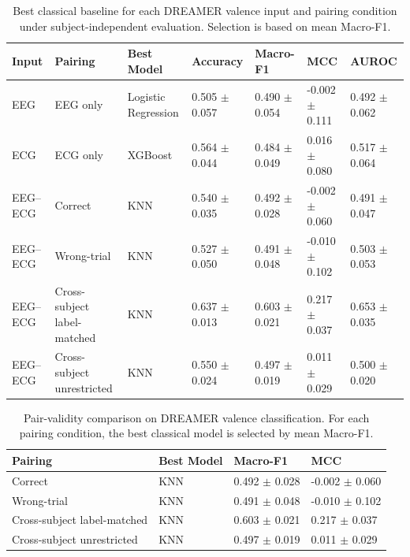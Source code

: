 \begin{table}[!t]
\centering
\caption{Best classical baseline for each DREAMER valence input and pairing condition under subject-independent evaluation. Selection is based on mean Macro-F1.}
\label{tab:dreamer_valence_best_classical}
\begin{tabular}{lllllll}
\toprule
Input & Pairing & Best Model & Accuracy & Macro-F1 & MCC & AUROC \\
\midrule
EEG & EEG only & Logistic Regression & 0.505 $\pm$ 0.057 & 0.490 $\pm$ 0.054 & -0.002 $\pm$ 0.111 & 0.492 $\pm$ 0.062 \\
ECG & ECG only & XGBoost & 0.564 $\pm$ 0.044 & 0.484 $\pm$ 0.049 & 0.016 $\pm$ 0.080 & 0.517 $\pm$ 0.064 \\
EEG--ECG & Correct & KNN & 0.540 $\pm$ 0.035 & 0.492 $\pm$ 0.028 & -0.002 $\pm$ 0.060 & 0.491 $\pm$ 0.047 \\
EEG--ECG & Wrong-trial & KNN & 0.527 $\pm$ 0.050 & 0.491 $\pm$ 0.048 & -0.010 $\pm$ 0.102 & 0.503 $\pm$ 0.053 \\
EEG--ECG & Cross-subject label-matched & KNN & 0.637 $\pm$ 0.013 & 0.603 $\pm$ 0.021 & 0.217 $\pm$ 0.037 & 0.653 $\pm$ 0.035 \\
EEG--ECG & Cross-subject unrestricted & KNN & 0.550 $\pm$ 0.024 & 0.497 $\pm$ 0.019 & 0.011 $\pm$ 0.029 & 0.500 $\pm$ 0.020 \\
\bottomrule
\end{tabular}
\end{table}

\begin{table}[!t]
\centering
\caption{Pair-validity comparison on DREAMER valence classification. For each pairing condition, the best classical model is selected by mean Macro-F1.}
\label{tab:dreamer_valence_pair_validity}
\begin{tabular}{llll}
\toprule
Pairing & Best Model & Macro-F1 & MCC \\
\midrule
Correct & KNN & 0.492 $\pm$ 0.028 & -0.002 $\pm$ 0.060 \\
Wrong-trial & KNN & 0.491 $\pm$ 0.048 & -0.010 $\pm$ 0.102 \\
Cross-subject label-matched & KNN & 0.603 $\pm$ 0.021 & 0.217 $\pm$ 0.037 \\
Cross-subject unrestricted & KNN & 0.497 $\pm$ 0.019 & 0.011 $\pm$ 0.029 \\
\bottomrule
\end{tabular}
\end{table}

